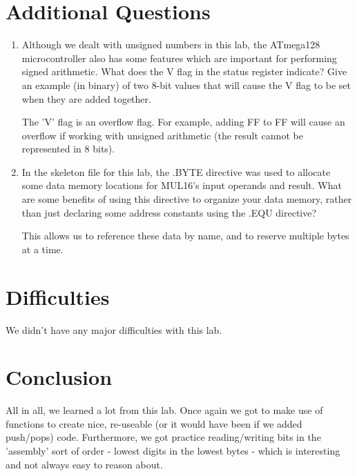 \documentclass[12pt,letterpaper]{article}
\begin{document}
\section{Additional Questions}
\begin{enumerate}
    \item
    Although we dealt with unsigned numbers in this lab, the ATmega128 microcontroller
    also has some features which are important for performing signed
    arithmetic. What does the V flag in the status register indicate? Give an
    example (in binary) of two 8-bit values that will cause the V flag to be set
    when they are added together.


	The 'V' flag is an overflow flag. For example, adding FF to FF will cause an overflow if working with unsigned arithmetic (the result cannot be represented in 8 bits).

    \item
    In the skeleton file for this lab, the .BYTE directive was used to allocate
    some data memory locations for MUL16's input operands and result. What
    are some benefits of using this directive to organize your data memory, rather
    than just declaring some address constants using the .EQU directive?

    
    This allows us to reference these data by name, and to reserve multiple bytes at a time.

\end{enumerate}

\section{Difficulties}
We didn't have any major difficulties with this lab.

\section{Conclusion}
All in all, we learned a lot from this lab. Once again we got to make use of functions to create nice, re-useable (or it would have been if we added push/pops) code. Furthermore, we got practice reading/writing bits in the 'assembly' sort of order - lowest digits in the lowest bytes - which is interesting and not always easy to reason about.
\end{document}
